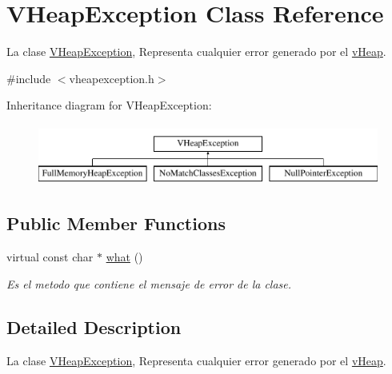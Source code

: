 \hypertarget{class_v_heap_exception}{\section{V\-Heap\-Exception Class Reference}
\label{class_v_heap_exception}
}


La clase \hyperlink{class_v_heap_exception}{V\-Heap\-Exception}, Representa cualquier error generado por el \hyperlink{classv_heap}{v\-Heap}.  




{\ttfamily \#include $<$vheapexception.\-h$>$}

Inheritance diagram for V\-Heap\-Exception\-:\begin{figure}[H]
\begin{center}
\leavevmode
\includegraphics[height=2.000000cm]{class_v_heap_exception}
\end{center}
\end{figure}
\subsection*{Public Member Functions}
\begin{DoxyCompactItemize}
\item 
virtual const char $\ast$ \hyperlink{class_v_heap_exception_a58154e8dc02f9c28dfefad7897f8b2cf}{what} ()
\begin{DoxyCompactList}\small\item\em Es el metodo que contiene el mensaje de error de la clase. \end{DoxyCompactList}\end{DoxyCompactItemize}


\subsection{Detailed Description}
La clase \hyperlink{class_v_heap_exception}{V\-Heap\-Exception}, Representa cualquier error generado por el \hyperlink{classv_heap}{v\-Heap}. 

